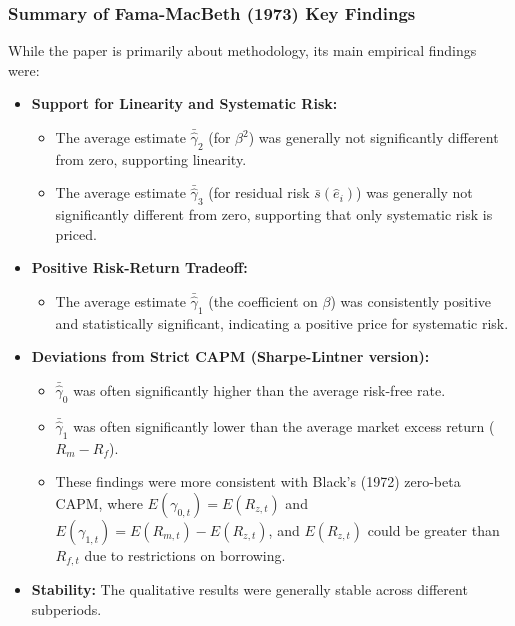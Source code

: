 \documentclass[10pt]{beamer}
\begin{document}
\begin{frame}[allowframebreaks]
  \frametitle{Summary of Fama-MacBeth (1973) Key Findings}
  While the paper is primarily about methodology, its main empirical findings were:

  \begin{itemize}
    \item \textbf{Support for Linearity and Systematic Risk:}
      \begin{itemize}
        \item The average estimate $\bar{\hat{\gamma}}_2$ (for $\beta^2$) was generally not significantly different from zero, supporting linearity.
        \item The average estimate $\bar{\hat{\gamma}}_3$ (for residual risk $\bar{s}(\hat{e}_i)$) was generally not significantly different from zero, supporting that only systematic risk is priced.
      \end{itemize}
    \item \textbf{Positive Risk-Return Tradeoff:}
      \begin{itemize}
        \item The average estimate $\bar{\hat{\gamma}}_1$ (the coefficient on $\beta$) was consistently positive and statistically significant, indicating a positive price for systematic risk.
      \end{itemize}
    \item \textbf{Deviations from Strict CAPM (Sharpe-Lintner version):}
      \begin{itemize}
        \item $\bar{\hat{\gamma}}_0$ was often significantly higher than the average risk-free rate.
        \item $\bar{\hat{\gamma}}_1$ was often significantly lower than the average market excess return ($R_m - R_f$).
        \item These findings were more consistent with Black's (1972) zero-beta CAPM, where $E(\gamma_{0,t}) = E(R_{z,t})$ and $E(\gamma_{1,t}) = E(R_{m,t}) - E(R_{z,t})$, and $E(R_{z,t})$ could be greater than $R_{f,t}$ due to restrictions on borrowing.
      \end{itemize}
    \item \textbf{Stability:} The qualitative results were generally stable across different subperiods.
  \end{itemize}
\end{frame}
\end{document}
